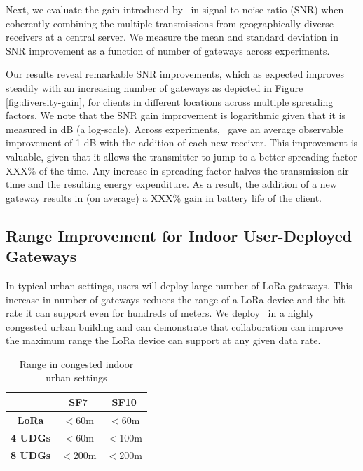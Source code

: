 Next, we evaluate the  gain introduced by \name\ in signal-to-noise ratio (SNR) when coherently combining the multiple transmissions from geographically diverse receivers at a central server. We measure the mean and standard deviation in SNR improvement as a function of number of gateways across experiments.  

Our results reveal remarkable SNR improvements, which as expected improves steadily with an increasing number of gateways as depicted in Figure \ref{fig:diversity-gain}, for clients in different locations across multiple spreading factors. We note that the SNR gain improvement is logarithmic given that it is measured in dB (a log-scale). Across experiments, \name\ gave an average observable improvement of 1 dB with the addition of each new receiver. This improvement is valuable, given that it allows the transmitter to jump to a better spreading factor XXX\% of the time. Any increase in spreading factor halves the transmission air time and the resulting energy expenditure. As a result, the addition of a new gateway results in (on average) a XXX\% gain in battery life of the client. 

\subsection{Range Improvement for Indoor User-Deployed Gateways}

In typical urban settings, users will deploy large number of LoRa gateways. This increase in number of gateways reduces the range of a LoRa device and the bit-rate it can support even for hundreds of meters. We deploy \name\ in a highly congested urban building and can demonstrate that collaboration can improve the maximum range the LoRa device can support at any given data rate.


\begin{table}
\centering \begin{tabular}{||c | c | c||} 
 \hline
  & \textbf{SF7} & \textbf{SF10} \\ [0.5ex] 
 \hline\hline
 \textbf{LoRa} & $<$60m & $<$60m  \\ 
 \hline
 \textbf{4 UDGs} & $<$60m & $<$100m  \\
 \hline
 \textbf{8 UDGs} & $<$200m & $<$200m \\
 \hline
\end{tabular}
\caption{Range in congested indoor urban settings}
\label{tab:range}
\vspace*{-0.1in}
\end{table}

